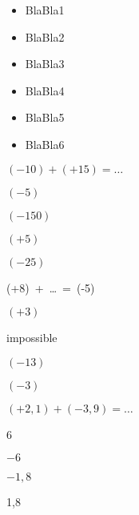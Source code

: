 \begin{acquis}
\begin{itemize}
\item BlaBla1
\item BlaBla2
\item BlaBla3
\item BlaBla4
\item BlaBla5
\item BlaBla6
\end{itemize}
\end{acquis}


\begin{QCM}
  \begin{GroupeQCM}
    \begin{exercice}
      $(-10) + (+15) = \ldots$
      \begin{ChoixQCM}{4}
      \item $(-5)$
      \item $(-150)$
      \item $(+5)$
      \item $(-25)$
      \end{ChoixQCM}
\begin{corrige}
   \end{corrige}
    \end{exercice}
    
    
    \begin{exercice}
      (+8) + \ldots = (-5)
      \begin{ChoixQCM}{4}
      \item $(+3)$
      \item impossible
      \item $(-13)$
      \item $(-3)$
      \end{ChoixQCM}
\begin{corrige}
   \end{corrige}
    \end{exercice}
    
    
    \begin{exercice}
      $(+2,1) + (-3,9) = \ldots$
      \begin{ChoixQCM}{4}
      \item 6
      \item $-6$
      \item $-1,8$
      \item 1,8
      \end{ChoixQCM}
\begin{corrige}
   \end{corrige}
    \end{exercice}
    

\end{GroupeQCM}
\end{QCM}

